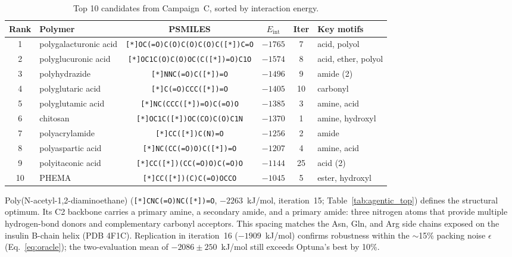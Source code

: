 \documentclass[twocolumn]{fairmeta}
\begin{document}
\begin{table}[t]
\centering
\caption{Top 10 candidates from Campaign~C, sorted by interaction energy.}
\label{tab:agentic_top_c}
\small
\begin{tabular}{clcccl}
\toprule
\textbf{Rank} & \textbf{Polymer} & \textbf{PSMILES} & \textbf{$E_\text{int}$} & \textbf{Iter} & \textbf{Key motifs} \\
\midrule
1  & polygalacturonic acid & \texttt{\footnotesize [*]OC(=O)C(O)C(O)C(O)C([*])C=O} & $-1765$ & 7 & acid, polyol \\
2  & polyglucuronic acid & \texttt{\footnotesize [*]OC1C(O)C(O)OC(C([*])=O)C1O} & $-1574$ & 8 & acid, ether, polyol \\
3  & polyhydrazide & \texttt{\footnotesize [*]NNC(=O)C([*])=O} & $-1496$ & 9 & amide (2) \\
4  & polyglutaric acid & \texttt{\footnotesize [*]C(=O)CCC([*])=O} & $-1405$ & 10 & carbonyl \\
5  & polyglutamic acid & \texttt{\footnotesize [*]NC(CCC([*])=O)C(=O)O} & $-1385$ & 3 & amine, acid \\
6  & chitosan & \texttt{\footnotesize [*]OC1C([*])OC(CO)C(O)C1N} & $-1370$ & 1 & amine, hydroxyl \\
7  & polyacrylamide & \texttt{\footnotesize [*]CC([*])C(N)=O} & $-1256$ & 2 & amide \\
8  & polyaspartic acid & \texttt{\footnotesize [*]NC(CC(=O)O)C([*])=O} & $-1207$ & 4 & amine, acid \\
9  & polyitaconic acid & \texttt{\footnotesize [*]CC([*])(CC(=O)O)C(=O)O} & $-1144$ & 25 & acid (2) \\
10 & PHEMA & \texttt{\footnotesize [*]CC([*])(C)C(=O)OCCO} & $-1045$ & 5 & ester, hydroxyl \\
\bottomrule
\end{tabular}
\end{table}

Poly(N-acetyl-1,2-diaminoethane) (\texttt{[*]CNC(=O)NC([*])=O}, $-2263$~kJ/mol, iteration~15; Table~\ref{tab:agentic_top}) defines the structural optimum.
Its C2 backbone carries a primary amine, a secondary amide, and a primary amide: three nitrogen atoms that provide multiple hydrogen-bond donors and complementary carbonyl acceptors.
This spacing matches the Asn, Gln, and Arg side chains exposed on the insulin B-chain helix (PDB 4F1C).
Replication in iteration~16 ($-1909$~kJ/mol) confirms robustness within the ${\sim}$15\% packing noise $\epsilon$ (Eq.~\ref{eq:oracle}); the two-evaluation mean of $-2086 \pm 250$~kJ/mol still exceeds Optuna's best by 10\%.
\end{document}
